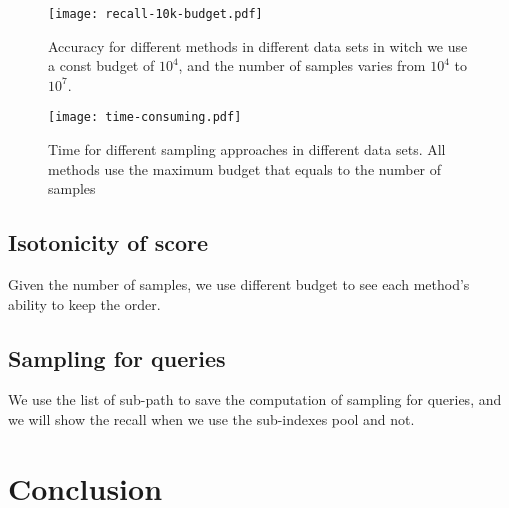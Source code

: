 \documentclass{article}
\begin{document}
\begin{figure}[ht]
  \centering
  \texttt{[image: recall-10k-budget.pdf]}\\
  \caption{Accuracy for different methods in different data sets in witch we use a const budget of $10^4$, and the number of samples varies from $10^4$ to $10^7$.}
  \label{Fig:Recall10kBudget}
\end{figure}

\begin{figure}[ht]
  \centering
  \texttt{[image: time-consuming.pdf]}\\
  \caption{Time for different sampling approaches in different data sets. All methods use the maximum budget that equals to the number of samples}
  \label{Fig:Recall10kBudget}
\end{figure}
\subsection{Isotonicity of score}
Given the number of samples, we use different budget to see each method's ability to keep the order.

\subsection{Sampling for queries}
We use the list of sub-path to save the computation of sampling for queries, and we will show the recall when we use the sub-indexes pool and not.

\section{Conclusion}
\end{document}
